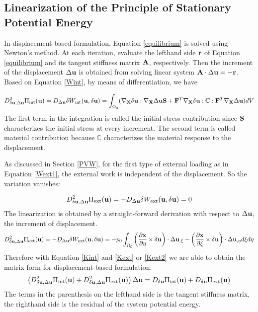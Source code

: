 %
\subsection{Linearization of the Principle of Stationary Potential Energy}
In displacement-based formulation, Equation \ref{equilibrium} is solved using Newton's method. At each iteration, evaluate the lefthand side $\bold{r}$ of Equation \ref{equilibrium} and its tangent stiffness matrix $\bold{A}$, respectively. Then the increment of the displacement $\Delta\bold{u}$ is obtained from solving linear system $\bold{A} \cdot \Delta\bold{u} = -\bold{r}$. Based on Equation \ref{Wint}, by means of differentiation, we have

\begin{equation} \label{Kint}
D^2_{\delta\bold{u}, \Delta\bold{u}}\Pi_\mathrm{int}(\bold{u}) = D_{\Delta{\bold{u}}}\delta{W_\mathrm{int}}(\bold{u}, \delta{\bold{u}}) = \int_{\Omega_0}(\nabla_{\bold{X}}\delta\bold{u} : \nabla_{\bold{X}}\Delta\bold{u}\bold{S} + \bold{F}^T\nabla_{\bold{X}}\delta{\bold{u}} : \mathbb{C} : \bold{F}^T \nabla_{\bold{X}}\Delta\bold{u})dV
\end{equation}
The first term in the integration is called the initial stress contribution since $\bold{S}$ characterizes the initial stress at every increment. The second term is called material contribution because $\mathbb{C}$ characterizes the material response to the displacement.

As discussed in Section \ref{PVW}, for the first type of external loading as in Equation \ref{Wext1}, the external work is independent of the displacement. So the variation vanishes:

\begin{equation} \label{Kext}
D^2_{\delta\bold{u}, \Delta\bold{u}}\Pi_\mathrm{ext}(\bold{u}) = - D_{\Delta{\bold{u}}}\delta{W_\mathrm{ext}}(\bold{u}, \delta{\bold{u}}) = 0
\end{equation}
The linearization is obtained by a straight-forward derivation with respect to $\Delta\bold{u}$, the increment of displacement. 
\begin{equation}  \label{Kext2}
D^2_{\delta\bold{u}, \Delta\bold{u}}\Pi_\mathrm{ext}(\bold{u}) = - D_{\Delta{\bold{u}}}\delta{W_\mathrm{ext}}(\bold{u}, \delta{\bold{u}}) = - p_0\int_{\Omega_{\xi}}  \left(\frac{\partial{\bold{x}}}{\partial{\eta}} \times \delta\bold{u}\right) \cdot\Delta{\bold{u}}_{,\xi} - 
\left(\frac{\partial{\bold{x}}}{\partial{\xi}} \times \delta\bold{u}\right) \cdot\Delta{\bold{u}}_{,\eta} d\xi{d\eta}
\end{equation}
Therefore with Equation \ref{Kint} and \ref{Kext} or \ref{Kext2} we are able to obtain the matrix form for displacement-based formulation:
\begin{equation} \label{matrix}
\left( D^2_{\delta\bold{u}, \Delta\bold{u}}\Pi_\mathrm{int}(\bold{u}) + D^2_{\delta\bold{u}, \Delta\bold{u}}\Pi_\mathrm{ext}(\bold{u})  \right) \Delta\bold{u} = D_{\delta\bold{u}}\Pi_\mathrm{int}(\bold{u}) + D_{\delta\bold{u}}\Pi_\mathrm{ext}(\bold{u})
\end{equation}
The terms in the parenthesis on the lefthand side is the tangent stiffness matrix, the righthand side is the residual of the system potential energy.

